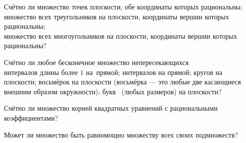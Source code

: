 \documentclass[a4paper,12pt]{article}
\begin{document}
 Сч\"етно ли \quad
 множество точек плоскости, обе координаты которых рациональны;\\
 множество всех треугольников на плоскости, координаты
вершин которых рациональны;\\
 множество всех многоугольников на плоскости, координаты
вершин которых рациональны?

Сч\"етно ли %
любое бесконечное множество непересекающихся\\
интервалов длины более $1$ на~прямой;
интервалов на прямой;
кругов на плоскости;
восьм\"ерок на плоскости
(восьм\"ерка --- это любые две касающиеся внешним образом
окружности);
букв \
(любых размеров) на плоскости?

Сч\"етно ли множество корней квадратных уравнений с рациональными
коэффициентами?


Может ли множество быть равномощно множеству всех своих подмножеств?
\кзадача








\end{document}
